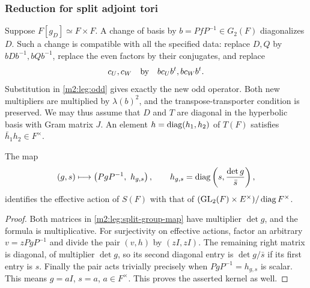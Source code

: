 \subsubsection{Reduction for split adjoint tori}

Suppose $F[g_D]\simeq F\times F$. A change of basis by
$b=PfP^{-1}\in G_2(F)$ diagonalizes $D$. Such a change is compatible
with all the specified data: replace $D,Q$ by $bDb^{-1},bQb^{-1}$,
replace the even factors by their conjugates, and replace
\[
 c_U,c_W\quad\hbox{by}\quad bc_Ub^t,bc_Wb^t.
\]
Substitution in \eqref{m2:leg:odd} gives exactly the new odd operator.
Both new multipliers are multiplied by $\lambda(b)^2$, and the
transpose-transporter condition is preserved. We may thus assume
that $D$ and $T$ are diagonal in the hyperbolic basis with Gram matrix
$J$. An element $h=\operatorname{diag}(h_1,h_2)$ of $T(F)$ satisfies
$\bar h_1h_2\in F^\times$.

\begin{lemma}\label{m2:leg:split-effective}
The map
\begin{equation}\label{m2:leg:split-group-map}
 (g,s)\longmapsto
 \left(PgP^{-1},\ h_{g,s}\right),\qquad
 h_{g,s}=\operatorname{diag}\left(s,\frac{\det g}{\bar s}\right),
\end{equation}
identifies the effective action of $S(F)$ with that of
$(\operatorname{GL}_2(F)\times E^\times)/\operatorname{diag} F^\times$.
\end{lemma}

\begin{proof}
Both matrices in \eqref{m2:leg:split-group-map} have multiplier $\det g$,
and the formula is multiplicative. For surjectivity on effective
actions, factor an arbitrary $v=zPgP^{-1}$ and divide the pair
$(v,h)$ by $(zI,zI)$. The remaining right matrix is diagonal, of
multiplier $\det g$, so its second diagonal entry is
$\det g/\bar s$ if its first entry is $s$.
Finally the pair acts trivially precisely when
$PgP^{-1}=h_{g,s}$ is scalar. This means $g=aI$, $s=a$,
$a\in F^\times$. This proves the asserted kernel as well.
\end{proof}

